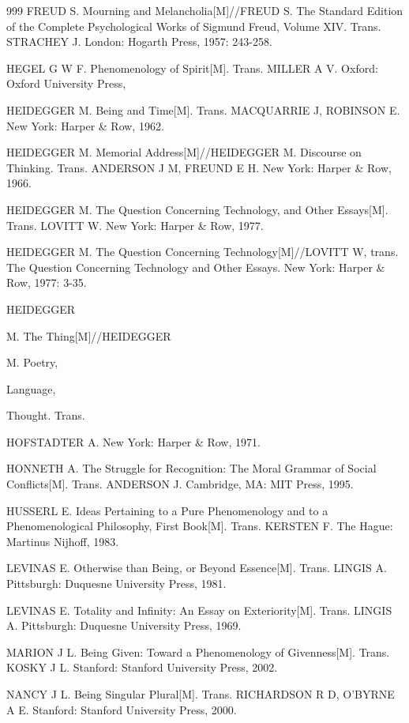 \begin{thebibliography}{999}
\bibitem{} FREUD S. Mourning and Melancholia[M]//FREUD S. The Standard Edition of the Complete Psychological Works of Sigmund Freud, Volume XIV. Trans. STRACHEY J. London: Hogarth Press, 1957: 243-258.

\bibitem{} HEGEL G W F. Phenomenology of Spirit[M]. Trans. MILLER A V. Oxford: Oxford University Press,

\bibitem{} HEIDEGGER M. Being and Time[M]. Trans. MACQUARRIE J, ROBINSON E. New York: Harper \& Row, 1962.

\bibitem{} HEIDEGGER M. Memorial Address[M]//HEIDEGGER M. Discourse on Thinking. Trans. ANDERSON J M, FREUND E H. New York: Harper \& Row, 1966.

\bibitem{} HEIDEGGER M. The Question Concerning Technology, and Other Essays[M]. Trans. LOVITT W. New York: Harper \& Row, 1977.

\bibitem{} HEIDEGGER M. The Question Concerning Technology[M]//LOVITT W, trans. The Question Concerning Technology and Other Essays. New York: Harper \& Row, 1977: 3-35.

\bibitem{} HEIDEGGER

\bibitem{} M. The Thing[M]//HEIDEGGER

\bibitem{} M. Poetry,

\bibitem{} Language,

\bibitem{} Thought. Trans.

\bibitem{} HOFSTADTER A. New York: Harper \& Row, 1971.

\bibitem{} HONNETH A. The Struggle for Recognition: The Moral Grammar of Social Conflicts[M]. Trans. ANDERSON J. Cambridge, MA: MIT Press, 1995.

\bibitem{} HUSSERL E. Ideas Pertaining to a Pure Phenomenology and to a Phenomenological Philosophy, First Book[M]. Trans. KERSTEN F. The Hague: Martinus Nijhoff, 1983.

\bibitem{} LEVINAS E. Otherwise than Being, or Beyond Essence[M]. Trans. LINGIS A. Pittsburgh: Duquesne University Press, 1981.

\bibitem{} LEVINAS E. Totality and Infinity: An Essay on Exteriority[M]. Trans. LINGIS A. Pittsburgh: Duquesne University Press, 1969.

\bibitem{} MARION J L. Being Given: Toward a Phenomenology of Givenness[M]. Trans. KOSKY J L. Stanford: Stanford University Press, 2002.

\bibitem{} NANCY J L. Being Singular Plural[M]. Trans. RICHARDSON R D, O’BYRNE A E. Stanford: Stanford University Press, 2000.


\end{thebibliography}
